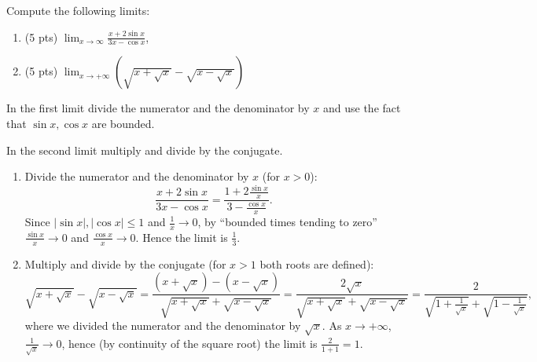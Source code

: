 
\begin{question}
Compute the following limits:
\begin{enumerate}
  \item (5 pts) $\displaystyle\lim_{x\to\infty}\frac{x+2\sin x}{3x-\cos x}$,
  \item (5 pts) $\displaystyle\lim_{x\to+\infty}\left(\sqrt{x+\sqrt{x}}-\sqrt{x-\sqrt{x}}\right)$
\end{enumerate}
\end{question}

\begin{hint}
In the first limit divide the numerator and the denominator by $x$ and use the fact that $\sin x,\cos x$ are bounded.
\end{hint}

\begin{hint}
In the second limit multiply and divide by the conjugate.
\end{hint}

\begin{solution}
\begin{enumerate}
  \item Divide the numerator and the denominator by $x$ (for $x>0$):
  \[ \frac{x+2\sin x}{3x-\cos x}=\frac{1+2\frac{\sin x}{x}}{3-\frac{\cos x}{x}} . \]
  Since $|\sin x|,|\cos x|\le1$ and $\frac1x\to0$, by ``bounded times tending to zero'' $\frac{\sin x}{x}\to0$ and $\frac{\cos x}{x}\to0$. Hence the limit is $\boxed{\frac13}$.
  \item Multiply and divide by the conjugate (for $x>1$ both roots are defined):
  \[ \sqrt{x+\sqrt x}-\sqrt{x-\sqrt x}=\frac{(x+\sqrt x)-(x-\sqrt x)}{\sqrt{x+\sqrt x}+\sqrt{x-\sqrt x}}=\frac{2\sqrt x}{\sqrt{x+\sqrt x}+\sqrt{x-\sqrt x}}
  =\frac{2}{\sqrt{1+\frac{1}{\sqrt x}}+\sqrt{1-\frac{1}{\sqrt x}}} , \]
  where we divided the numerator and the denominator by $\sqrt x$. As $x\to+\infty$, $\frac{1}{\sqrt x}\to0$, hence (by continuity of the square root) the limit is $\frac{2}{1+1}=\boxed{1}$.
\end{enumerate}
\end{solution}

